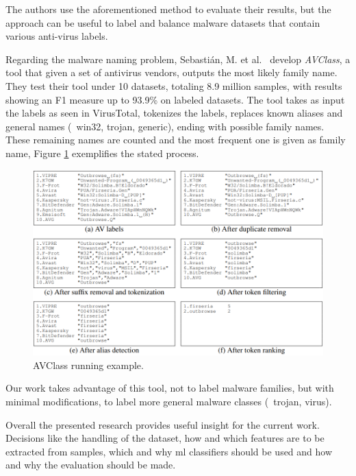 The authors use the aforementioned method to evaluate their results, but the approach can be useful to label and balance malware datasets that contain various anti-virus labels.

\medskip

Regarding the malware naming problem, Sebastián, M. et al.~\cite{sebastian2016avclass} develop \textit{AVClass}, a tool that given a set of antivirus vendors, outputs the most likely family name.
They test their tool under 10 datasets, totaling 8.9 million samples, with results showing an F1 measure up to 93.9\% on labeled datasets.
The tool takes as input the labels as seen in VirusTotal, tokenizes the labels, replaces known aliases and general names (\eg\ win32, trojan, generic), ending with possible family names. These remaining names are counted and the most frequent one is given as family name, Figure \ref{fig:avclass} exemplifies the stated process.

\begin{figure}[!htb]
	\centering
	\includegraphics[width=\columnwidth]{Figures/avclass.png}
	\caption{AVClass running example.}
	\label{fig:avclass}
\end{figure}

Our work takes advantage of this tool, not to label malware families, but with minimal modifications, to label more general malware classes (\eg\ trojan, virus).

\medskip

Overall the presented research provides useful insight for the current work. Decisions like the handling of the dataset, how and which features are to be extracted from samples, which and why \gls{ml} classifiers should be used and how and why the evaluation should be made.
